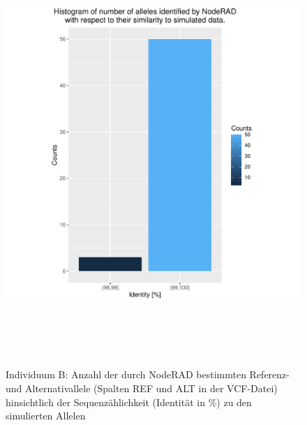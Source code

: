 \begin{figure}[H]
	\begin{center}
		\includegraphics[height=16cm]{bilder/evaluation/hist_perc_ident/B.plot_hist.pdf}
		\caption{Individuum B: Anzahl der durch NodeRAD bestimmten Referenz- und Alternativallele (Spalten REF und ALT in der VCF-Datei) hinsichtlich der Sequenzählichkeit (Identität in $ \% $) zu den simulierten Allelen}
	\end{center}
\end{figure}

